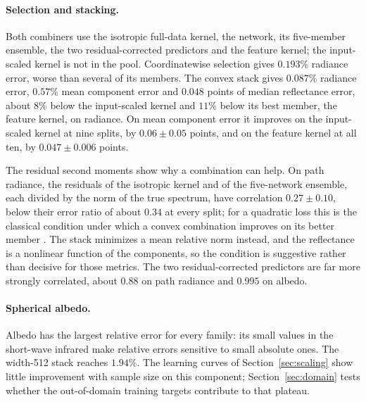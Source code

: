 \documentclass[11pt]{article}
\newcommand{\1}{\mathbf{1}}
\begin{document}
\paragraph{Selection and stacking.}
Both combiners use the isotropic full-data kernel, the network, its five-member ensemble,
the two residual-corrected predictors and the feature kernel; the input-scaled kernel is not
in the pool. Coordinatewise selection gives $0.193\%$ radiance error, worse than several of its
members. The convex stack gives $0.087\%$ radiance error, $0.57\%$ mean component error and
$0.048$ points of median reflectance error, about $8\%$ below the input-scaled kernel and $11\%$
below its best member, the feature kernel, on radiance. On mean component error it improves on
the input-scaled kernel at nine splits, by $0.06\pm0.05$ points, and on the feature kernel at all
ten, by $0.047\pm0.006$ points.

The residual second moments show why a combination can help. On path radiance, the residuals
of the isotropic kernel and of the five-network ensemble, each divided by the norm of the true
spectrum, have correlation $0.27\pm0.10$, below their error ratio of about $0.34$ at every
split; for a quadratic loss this is the classical
condition under which a convex combination improves on its better member
\cite{bates-granger,nmkc}. The stack minimizes a mean relative norm instead, and the reflectance
is a nonlinear function of the components, so the condition is suggestive rather than
decisive for those metrics. The two residual-corrected predictors are far more strongly
correlated, about $0.88$ on path radiance and $0.995$ on albedo.

\paragraph{Spherical albedo.}
Albedo has the largest relative error for every family: its small values in the short-wave
infrared make relative errors sensitive to small absolute ones. The width-512 stack reaches
$1.94\%$. The learning curves of Section~\ref{sec:scaling} show little improvement with sample
size on this component; Section~\ref{sec:domain} tests whether the out-of-domain training
targets contribute to that plateau.
\end{document}

